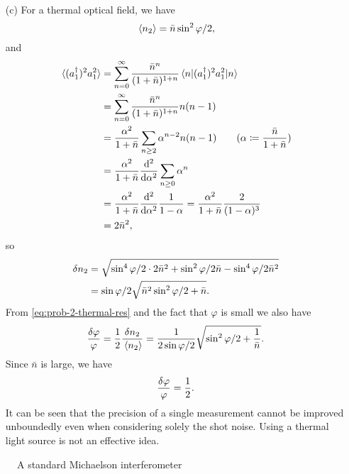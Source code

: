 \documentclass[hyperref, a4paper]{article}
\begin{document}
\begin{itemize}
\item[(c)] For a thermal optical field, we have 
\begin{equation}
    \expval*{n_2} = \bar{n} \sin^2 \varphi / 2,
    \label{eq:prob-2-thermal-res}
\end{equation}
and 
\[
    \begin{aligned}
        \expval*{(a_1^\dagger)^2 a_1^2} &= \sum_{n=0}^\infty \frac{\bar{n}^n}{(1 + \bar{n})^{1+n}} \expval*{(a_1^\dagger)^2 a_1^2}{n} \\
        &= \sum_{n=0}^\infty \frac{\bar{n}^n}{(1 + \bar{n})^{1+n}} n(n-1) \\
        &= \frac{\alpha^2}{1 + \bar{n}} \sum_{n \geq 2} \alpha^{n-2}  n(n-1)  \quad \quad (\alpha \coloneqq \frac{\bar{n}}{1 + \bar{n}}) \\
        &= \frac{\alpha^2}{1 + \bar{n}} \dv[2]{\alpha} \sum_{n \geq 0} \alpha^n \\
        &= \frac{\alpha^2}{1 + \bar{n}} \dv[2]{\alpha} \frac{1}{1 - \alpha} = \frac{\alpha^2}{1 + \bar{n}} \frac{2}{(1 - \alpha)^3} \\
        &= 2 \bar{n}^2,
    \end{aligned}
\]
so 
\begin{equation}
    \begin{aligned}
        \var{n_2} &= \sqrt{ \sin^4 \varphi / 2 \cdot 2 \bar{n}^2 + \sin^2 \varphi / 2 \bar{n} - \sin^4 \varphi / 2 \bar{n}^2 } \\
        &= \sin \varphi / 2 \sqrt{ \bar{n}^2 \sin^2 \varphi / 2 + \bar{n}}.
    \end{aligned}
\end{equation}
From \eqref{eq:prob-2-thermal-res} and the fact that $\varphi$ is small we also have 
\[
    \frac{\var{\varphi}}{\varphi} = \frac{1}{2} \frac{\var{n_2}}{\expval*{n_2}} = \frac{1}{2 \sin \varphi / 2} \sqrt{\sin^2 \varphi / 2 + \frac{1}{\bar{n}}}.
\]
Since $\bar{n}$ is large, we have 
\begin{equation}
    \frac{\var{\varphi}}{\varphi} = \frac{1}{2}.
\end{equation}
It can be seen that the precision of a single measurement cannot be improved unboundedly even when considering solely 
the shot noise. 
Using a thermal light source is not an effective idea.

\end{itemize}

\begin{figure}
    \centering
    
    \caption{A standard Michaelson interferometer}
    \label{fig:michaelson}
\end{figure}
\end{document}
